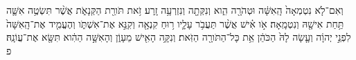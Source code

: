 \documentclass{openreader}
\begin{document}
וְאִם־לֹ֤א נִטְמְאָה֙ הָֽאִשָּׁ֔ה וּטְהֹרָ֖ה הִ֑וא וְנִקְּתָ֖ה וְנִזְרְעָ֥ה זָֽרַע׃ 
זֹ֥את תֹּורַ֖ת הַקְּנָאֹ֑ת אֲשֶׁ֨ר תִּשְׂטֶ֥ה אִשָּׁ֛ה תַּ֥חַת אִישָׁ֖הּ וְנִטְמָֽאָה׃ 
אֹ֣ו אִ֗ישׁ אֲשֶׁ֨ר תַּעֲבֹ֥ר עָלָ֛יו ר֥וּחַ קִנְאָ֖ה וְקִנֵּ֣א אֶת־אִשְׁתֹּ֑ו וְהֶעֱמִ֤יד אֶת־הָֽאִשָּׁה֙ לִפְנֵ֣י יְהוָ֔ה וְעָ֤שָׂה לָהּ֙ הַכֹּהֵ֔ן אֵ֥ת כָּל־הַתֹּורָ֖ה הַזֹּֽאת׃ 
וְנִקָּ֥ה הָאִ֖ישׁ מֵעָוֹ֑ן וְהָאִשָּׁ֣ה הַהִ֔וא תִּשָּׂ֖א אֶת־עֲוֹנָֽהּ׃ פ 
\end{document}
